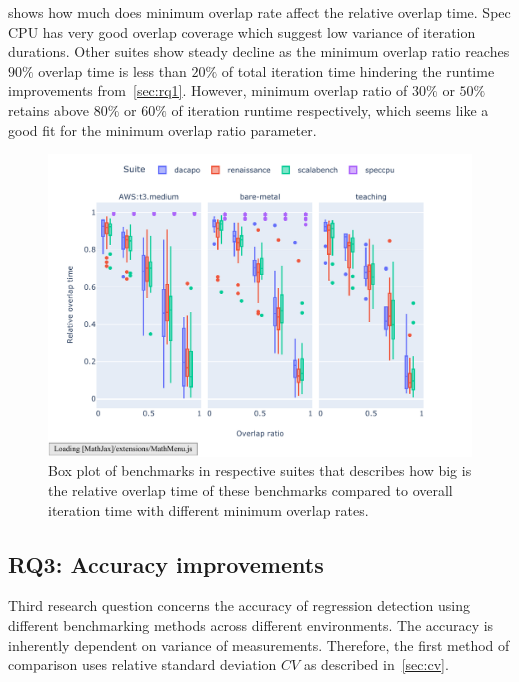  shows how much does minimum overlap rate affect the relative overlap time.
Spec CPU has very good overlap coverage which suggest low variance of iteration durations.
Other suites show steady decline as the minimum overlap ratio reaches $90\%$ overlap time is less than $20\%$ of total iteration time hindering the runtime improvements from~\cref{sec:rq1}.
However, minimum overlap ratio of $30\%$ or $50\%$ retains above $80\%$ or $60\%$ of iteration runtime respectively, which seems like a good fit for the minimum overlap ratio parameter.

\begin{figure}
	\centering
	\includegraphics[width=1\linewidth]{./figures/relative_overlap_time.pdf}
	\caption{
		Box plot of benchmarks in respective suites that describes how big is the relative overlap time of these benchmarks compared to overall iteration time with different minimum overlap rates.
	}
	\label{fig:relative_overlap_time}
\end{figure}


\subsection{RQ3: Accuracy improvements}
\label{sec:rq3}

Third research question concerns the accuracy of regression detection using different benchmarking methods across different environments.
The accuracy is inherently dependent on variance of measurements.
Therefore, the first method of comparison uses relative standard deviation $CV$ as described in~\cref{sec:cv}.

